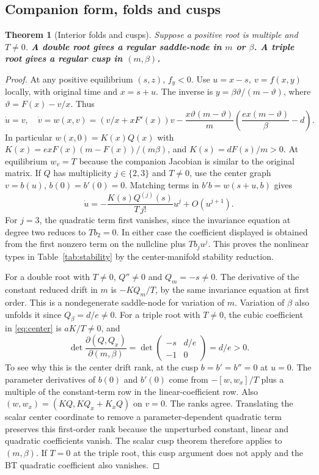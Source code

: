 \documentclass[12pt,a4paper,twoside,fleqn]{article}
\theoremstyle{journal}
\newtheorem{theorem}{Theorem}
\newcommand{\claim}[1]{{\normalfont\bfseries\boldmath #1}}
\begin{document}
\subsection{Companion form, folds and cusps}\label{sec:comp}
\begin{theorem}[Interior folds and cusps]\label{thm:fold}
Suppose a positive root is multiple and \(T\ne0\).
\claim{A double root gives a regular saddle-node in \(m\) or \(\beta\). A triple root gives a regular cusp in \((m,\beta)\).}
\end{theorem}
\begin{proof}
At any positive equilibrium \((s,z)\), \(f_y<0\). Use \(u=x-s,\ v=f(x,y)\) locally, with original time and \(x=s+u\). The inverse is \(y=\beta\vartheta/(m-\vartheta)\), where \(\vartheta=F(x)-v/x\). Thus
\begin{equation}\label{eq:comp}
 \dot u=v,\quad \dot v=w(x,v)=
 \left(v/x+xF'(x)\right)v
 -\frac{x\vartheta(m-\vartheta)}{m}
   \left(\frac{ex(m-\vartheta)}{\beta}-d\right).
\end{equation}
In particular \(w(x,0)=K(x)Q(x)\) with \(K(x)=exF(x)(m-F(x))/(m\beta)\), and \(K(s)=dF(s)/m>0\). At equilibrium \(w_v=T\) because the companion Jacobian is similar to the original matrix. If \(Q\) has multiplicity \(j\in\{2,3\}\) and \(T\ne0\), use the center graph \(v=b(u)\), \(b(0)=b'(0)=0\). Matching terms in \(b'b=w(s+u,b)\) gives
\begin{equation}\label{eq:center}
 \dot u=-\frac{K(s)Q^{(j)}(s)}{T\,j!}u^j+O(u^{j+1}).
\end{equation}
For \(j=3\), the quadratic term first vanishes, since the invariance equation at degree two reduces to \(T b_2=0\). In either case the coefficient displayed is obtained from the first nonzero term on the nullcline plus \(T b_j u^j\). This proves the nonlinear types in Table~\ref{tab:stability} by the center-manifold stability reduction.

For a double root with \(T\ne0\), \(Q''\ne0\) and \(Q_m=-s\ne0\). The derivative of the constant reduced drift in \(m\) is \(-KQ_m/T\), by the same invariance equation at first order. This is a nondegenerate saddle-node for variation of \(m\). Variation of \(\beta\) also unfolds it since \(Q_\beta=d/e\ne0\). For a triple root with \(T\ne0\), the cubic coefficient in \eqref{eq:center} is \(aK/T\ne0\), and
\[
 \det\frac{\partial(Q,Q_x)}{\partial(m,\beta)}
 =\det\begin{pmatrix}-s&d/e\\-1&0\end{pmatrix}=d/e>0.
\]
To see why this is the center drift rank, at the cusp \(b=b'=b''=0\) at \(u=0\). The parameter derivatives of \(b(0)\) and \(b'(0)\) come from \(-[w,w_x]/T\) plus a multiple of the constant-term row in the linear-coefficient row. Also \((w,w_x)=(KQ,KQ_x+K_xQ)\) on \(v=0\). The ranks agree. Translating the scalar center coordinate to remove a parameter-dependent quadratic term preserves this first-order rank because the unperturbed constant, linear and quadratic coefficients vanish. The scalar cusp theorem therefore applies to \((m,\beta)\). If \(T=0\) at the triple root, this cusp argument does not apply and the BT quadratic coefficient also vanishes.


\end{proof}
\end{document}
